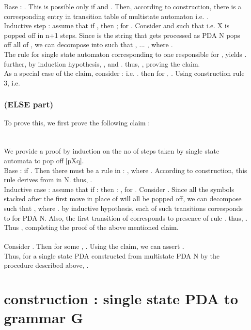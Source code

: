 \documentclass[11pt,a4paper,portrait]{extarticle}
\begin{document}
Base : . This is possible only if  and . 
Then, according to construction, there is a corresponding entry in transition table of multistate automaton i.e. . \\

Inductive step : assume that if , then ; for . Consider  and  such that  i.e. X is popped off in n+1 steps.
Since  is the string that gets processed as PDA N pops off all of , we can decompose  into  such that ,  ... , where .\\
The rule for single state automaton corresponding to one responsible for , yields . further, by induction hypothesis, ,  and . thus, , proving the claim.\\
As a special case of the claim, consider :  i.e. . then for , . 
Using construction rule 3,  i.e. 

\subsubsection{(ELSE part) }
To prove this, we first prove the following claim :\\
\\
\\
We provide a proof by induction on the no of steps taken by single state automata to pop off [pXq].\\

Base : if . Then there must be a rule in  : , where . 
According to construction, this rule derives from  in N. thus, .\\

Inductive case : assume that if :  then : , for . Consider     . 
Since all the symbols stacked after the first move in place of  will all be popped off, we can decompose  such that , where  . by inductive hypothesis, each of such transitions corresponds to  for PDA N. 
Also, the first transition of  corresponds to presence of rule . thus, . 
Thus , completing the proof of the above mentioned claim.\\\\
Consider . Then for some , . Using the claim, we can assert . \\

Thus, for a single state PDA  constructed from multistate PDA N by the procedure described above, .

\section{construction : single state PDA to grammar G}
\end{document}
